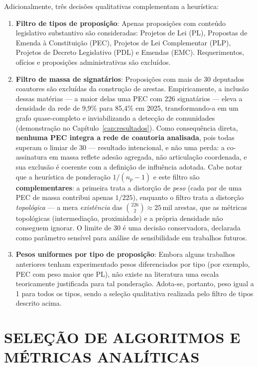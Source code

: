 \documentclass[
      12pt,
      a4paper,
      openright,
      oneside,
      chapter=TITLE,
      section=TITLE,
      english,
      french,
      spanish,
      brazilian
    ]{abntex2}
\begin{document}
    Adicionalmente, três decisões qualitativas complementam a heurística:
    
    \begin{enumerate}[label=\alph*)]
        \item \textbf{Filtro de tipos de proposição}: 
        Apenas proposições com conteúdo legislativo substantivo são consideradas: Projetos de Lei (PL), Propostas de Emenda à Constituição (PEC), Projetos de Lei Complementar (PLP), Projetos de Decreto Legislativo (PDL) e Emendas (EMC). Requerimentos, ofícios e proposições administrativas são excluídos.
        
        \item \textbf{Filtro de massa de signatários}: Proposições com mais de 30 deputados coautores são excluídas da construção de arestas. Empiricamente, a inclusão dessas matérias --- a maior delas uma PEC com 226 signatários --- eleva a densidade da rede de 9{,}9\% para 85{,}4\% em 2025, transformando-a em um grafo quase-completo e inviabilizando a detecção de comunidades (demonstração no Capítulo~\ref{cap:resultados}). Como consequência direta, \textbf{nenhuma PEC integra a rede de coautoria analisada}, pois todas superam o limiar de 30 --- resultado intencional, e não uma perda: a co-assinatura em massa reflete adesão agregada, não articulação coordenada, e sua exclusão é coerente com a definição de influência adotada. Cabe notar que a heurística de ponderação $1/(n_p-1)$ e este filtro são \textbf{complementares}: a primeira trata a distorção de \emph{peso} (cada par de uma PEC de massa contribui apenas $1/225$), enquanto o filtro trata a distorção \emph{topológica} --- a mera \emph{existência} das $\binom{226}{2} \approx 25\,\text{mil}$ arestas, que as métricas topológicas (intermediação, proximidade) e a própria densidade não conseguem ignorar. O limite de 30 é uma decisão conservadora, declarada como parâmetro sensível para análise de sensibilidade em trabalhos futuros.
    
        \item \textbf{Pesos uniformes por tipo de proposição}: Embora alguns trabalhos anteriores tenham experimentado pesos diferenciados por tipo (por exemplo, PEC com peso maior que PL), não existe na literatura uma escala teoricamente justificada para tal ponderação. Adota-se, portanto, peso igual a 1 para todos os tipos, sendo a seleção qualitativa realizada pelo filtro de tipos descrito acima.
    \end{enumerate}
    
    \section{SELEÇÃO DE ALGORITMOS E MÉTRICAS ANALÍTICAS}
    
\end{document}
